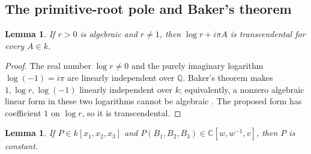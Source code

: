 \documentclass[11pt,a4paper]{article}
\newtheorem{lemma}[theorem]{Lemma}
\theoremstyle{definition}\newtheorem{definition}[theorem]{Definition}
\theoremstyle{remark}\newtheorem{remark}[theorem]{Remark}
\begin{document}
\subsection{The primitive-root pole and Baker's theorem}
\begin{lemma}\label{ext:th3:Baker}
If $r>0$ is algebraic and $r\ne1$, then
$\log r+i\pi A$ is transcendental for every $A\in k$.
\end{lemma}

\begin{proof}
The real number $\log r\ne0$ and the purely imaginary logarithm
$\log(-1)=i\pi$ are linearly independent over $\mathbb Q$.
Baker's theorem makes $1,\log r,\log(-1)$ linearly independent over $k$;
equivalently, a nonzero algebraic linear form in these two logarithms
cannot be algebraic \cite{BakerIII}.  The proposed form has coefficient
$1$ on $\log r$, so it is transcendental.
\end{proof}

\begin{lemma}\label{ext:th3:numerator}
If $P\in k[x_1,x_2,x_3]$ and
$P(B_1,B_2,B_3)\in\mathbb C[w,w^{-1},v]$, then $P$ is constant.
\end{lemma}
\end{document}
